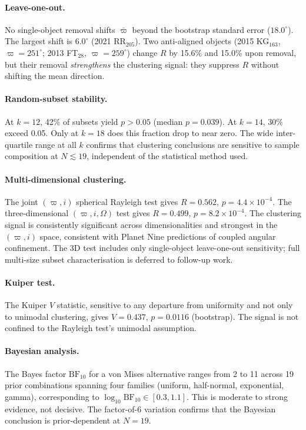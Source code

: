 \documentclass{aa}
\begin{document}
\paragraph{Leave-one-out.}
No single-object removal shifts $\bar{\varpi}$ beyond the bootstrap standard error ($18.0^\circ$). The largest shift is $6.0^\circ$ (2021 RR$_{205}$). Two anti-aligned objects (2015 KG$_{163}$, $\varpi=251^\circ$; 2013 FT$_{28}$, $\varpi=259^\circ$) change $R$ by 15.6\% and 15.0\% upon removal, but their removal \textit{strengthens} the clustering signal: they suppress $R$ without shifting the mean direction.

\paragraph{Random-subset stability.}
At $k=12$, 42\% of subsets yield $p>0.05$ (median $p=0.039$). At $k=14$, 30\% exceed 0.05. Only at $k=18$ does this fraction drop to near zero. The wide inter-quartile range at all $k$ confirms that clustering conclusions are sensitive to sample composition at $N\lesssim19$, independent of the statistical method used.

\paragraph{Multi-dimensional clustering.}
The joint $(\varpi, i)$ spherical Rayleigh test gives $R=0.562$, $p=4.4\times10^{-4}$. The three-dimensional $(\varpi, i, \Omega)$ test gives $R=0.499$, $p=8.2\times10^{-4}$. The clustering signal is consistently significant across dimensionalities and strongest in the $(\varpi, i)$ space, consistent with Planet Nine predictions of coupled angular confinement. The 3D test includes only single-object leave-one-out sensitivity; full multi-size subset characterisation is deferred to follow-up work.

\paragraph{Kuiper test.}
The Kuiper $V$ statistic, sensitive to any departure from uniformity and not only to unimodal clustering, gives $V=0.437$, $p=0.0116$ (bootstrap). The signal is not confined to the Rayleigh test's unimodal assumption.

\paragraph{Bayesian analysis.}
The Bayes factor $\mathrm{BF}_{10}$ for a von Mises alternative ranges from 2 to 11 across 19 prior combinations spanning four families (uniform, half-normal, exponential, gamma), corresponding to $\log_{10}\mathrm{BF}_{10}\in[0.3,1.1]$. This is moderate to strong evidence, not decisive. The factor-of-6 variation confirms that the Bayesian conclusion is prior-dependent at $N=19$.
\end{document}
